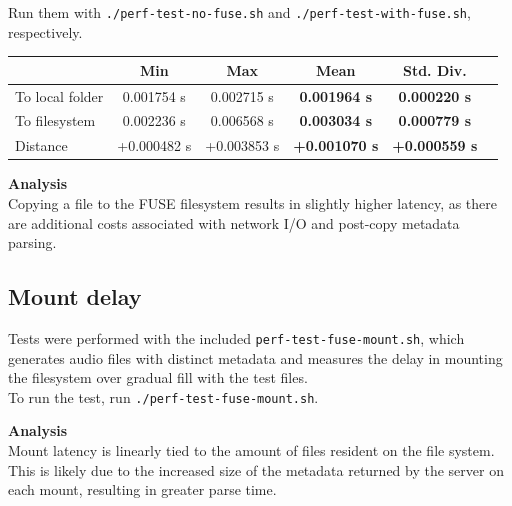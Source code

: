 \documentclass{article}
\begin{document}
	\noindent Run them with \texttt{./perf-test-no-fuse.sh} and \texttt{./perf-test-with-fuse.sh}, respectively.
	
	\vspace{0.25cm}
	\noindent 
	
	\vspace{0.5cm}
	\noindent \begin{tabular}{l*{4}{c}r}
		& Min & Max & Mean & Std. Div. & \\
		\hline
		To local folder & 0.001754 s & 0.002715 s & \textbf{0.001964 s} & \textbf{0.000220 s} &  \\
		To filesystem & 0.002236 s & 0.006568 s & \textbf{0.003034 s} & \textbf{0.000779 s} &  \\
		Distance           & +0.000482 s & +0.003853 s & \textbf{+0.001070 s} & \textbf{+0.000559 s} & \\
	\end{tabular}

	\vspace{0.5cm} 
	
	\noindent \textbf{Analysis} \\
	Copying a file to the FUSE filesystem results in slightly higher latency, as there are additional costs associated with network I/O and post-copy metadata parsing.
	
	\pagebreak
	
	\subsection{Mount delay}
	Tests were performed with the included \texttt{perf-test-fuse-mount.sh}, which generates audio files with distinct metadata and measures the delay in mounting the filesystem over gradual fill with the test files. \\
	
	\noindent To run the test, run \texttt{./perf-test-fuse-mount.sh}.
	
	\vspace{0.25cm}
	\noindent 
	
	\vspace{0.5cm}
	
	\noindent \textbf{Analysis} \\
	Mount latency is linearly tied to the amount of files resident on the file system. This is likely due to the increased size of the metadata returned by the server on each mount, resulting in greater parse time.
\end{document}
